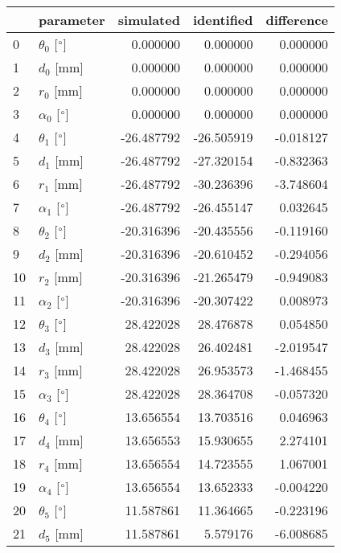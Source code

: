 \documentclass{standalone}%
\begin{document}
%
\normalsize%
\begin{tabular}{llrrr}
\toprule
{} &                 parameter &  simulated & identified & difference \\
\midrule
0  &  $\theta_{0}$ [$\degree$] &   0.000000 &   0.000000 &   0.000000 \\
1  &              $d_{0}$ [mm] &   0.000000 &   0.000000 &   0.000000 \\
2  &              $r_{0}$ [mm] &   0.000000 &   0.000000 &   0.000000 \\
3  &  $\alpha_{0}$ [$\degree$] &   0.000000 &   0.000000 &   0.000000 \\
4  &  $\theta_{1}$ [$\degree$] & -26.487792 & -26.505919 &  -0.018127 \\
5  &              $d_{1}$ [mm] & -26.487792 & -27.320154 &  -0.832363 \\
6  &              $r_{1}$ [mm] & -26.487792 & -30.236396 &  -3.748604 \\
7  &  $\alpha_{1}$ [$\degree$] & -26.487792 & -26.455147 &   0.032645 \\
8  &  $\theta_{2}$ [$\degree$] & -20.316396 & -20.435556 &  -0.119160 \\
9  &              $d_{2}$ [mm] & -20.316396 & -20.610452 &  -0.294056 \\
10 &              $r_{2}$ [mm] & -20.316396 & -21.265479 &  -0.949083 \\
11 &  $\alpha_{2}$ [$\degree$] & -20.316396 & -20.307422 &   0.008973 \\
12 &  $\theta_{3}$ [$\degree$] &  28.422028 &  28.476878 &   0.054850 \\
13 &              $d_{3}$ [mm] &  28.422028 &  26.402481 &  -2.019547 \\
14 &              $r_{3}$ [mm] &  28.422028 &  26.953573 &  -1.468455 \\
15 &  $\alpha_{3}$ [$\degree$] &  28.422028 &  28.364708 &  -0.057320 \\
16 &  $\theta_{4}$ [$\degree$] &  13.656554 &  13.703516 &   0.046963 \\
17 &              $d_{4}$ [mm] &  13.656553 &  15.930655 &   2.274101 \\
18 &              $r_{4}$ [mm] &  13.656554 &  14.723555 &   1.067001 \\
19 &  $\alpha_{4}$ [$\degree$] &  13.656554 &  13.652333 &  -0.004220 \\
20 &  $\theta_{5}$ [$\degree$] &  11.587861 &  11.364665 &  -0.223196 \\
21 &              $d_{5}$ [mm] &  11.587861 &   5.579176 &  -6.008685 \\

\end{tabular}
\end{document}
